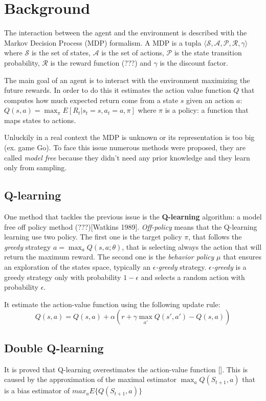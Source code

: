 \section{Background}


The interaction between the agent and the environment is described  with the
Markov Decision Process (MDP) formalism. A MDP is a tupla $\langle \mathcal{S}, 
\mathcal{A}, \mathcal{P}, \mathcal{R}, \gamma \rangle$ where $\mathcal{S}$ is
the set of states, $\mathcal{A}$ is the set of actions, $\mathcal{P}$ is the 
state transition probability, $\mathcal{R}$ is the reward function (???) and 
$\gamma$ is the discount factor.

The main goal of an agent is to interact with the environment maximizing the future rewards. In order to do this it estimates the action value function $Q$ that computes how much expected return come from a state $s$ given an action $a$: $Q(s, a) = \max_\pi E[R_t | s_t = s, a_t = a, \pi]$ where $\pi$ is a policy: a function that maps states to actions.


Unluckily in a real context the MDP is unknown or its representation is too big
(ex. game Go). To face this issue numerous methods were proposed, they are 
called \textit{model free} because they didn't need any prior knowledge and they learn only from sampling.


\subsection{Q-learning}

One method that tackles the previous issue is the \textbf{Q-learning} algorithm: a model free off policy method (???)[Watkins 1989]. 
\textit{Off-policy} means that the Q-learning learning use two policy. The first one is the target policy $\pi$, that follows the \textit{greedy} strategy $a = \max_a Q(s, a; \theta)$, that is selecting always the action that will return the maximum reward.
The second one is the \textit{behavior policy} $\mu$ that ensures an exploration of the states space, typically an \textit{$\epsilon$-greedy} strategy. \textit{$\epsilon$-greedy} is a greedy strategy only with probability $1 - \epsilon$ and selects a random action with probability $\epsilon$.

It estimate the action-value function using the following update rule:
\begin{equation}
	Q(s,a) = Q(s, a) + \alpha (r + \gamma \max_{a'} Q(s', a') - Q(s, a))
\end{equation}


\subsection{Double Q-learning}

It is proved that Q-learning overestimates the action-value function []. This is caused by the approximation of the maximal estimator $\max_a Q(S_{t+1}, a)$ that is a bias estimator of $max_a E \{ Q(S_{t+1}, a) \}$
